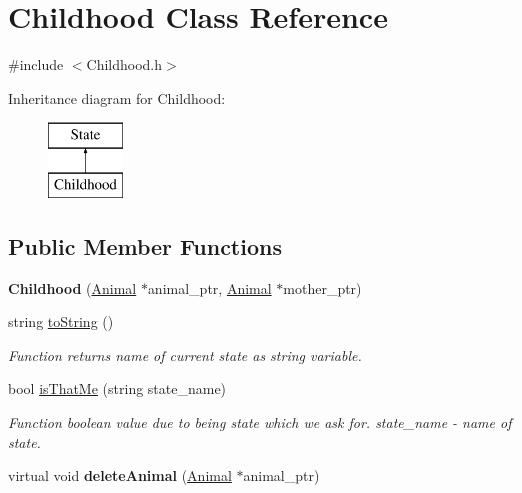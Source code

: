 \hypertarget{class_childhood}{}\section{Childhood Class Reference}
\label{class_childhood}


{\ttfamily \#include $<$Childhood.\+h$>$}

Inheritance diagram for Childhood\+:\begin{figure}[H]
\begin{center}
\leavevmode
\includegraphics[height=2.000000cm]{class_childhood}
\end{center}
\end{figure}
\subsection*{Public Member Functions}
\begin{DoxyCompactItemize}
\item 
\hypertarget{class_childhood_aaec37e08923bd9b4ee70fb91978f6872}{}{\bfseries Childhood} (\hyperlink{class_animal}{Animal} $\ast$animal\+\_\+ptr, \hyperlink{class_animal}{Animal} $\ast$mother\+\_\+ptr)\label{class_childhood_aaec37e08923bd9b4ee70fb91978f6872}

\item 
string \hyperlink{class_childhood_af7cb046d34104c1f8eabf20f2c35321e}{to\+String} ()
\begin{DoxyCompactList}\small\item\em Function returns name of current state as string variable. \end{DoxyCompactList}\item 
bool \hyperlink{class_childhood_ad94f07e6803c6bdbd6ee752e6eef9019}{is\+That\+Me} (string state\+\_\+name)
\begin{DoxyCompactList}\small\item\em Function boolean value due to being state which we ask for.  state\+\_\+name -\/ name of state. \end{DoxyCompactList}\item 
\hypertarget{class_childhood_a5a9852ffda98ed530df8b2276fb43d10}{}virtual void {\bfseries delete\+Animal} (\hyperlink{class_animal}{Animal} $\ast$animal\+\_\+ptr)\label{class_childhood_a5a9852ffda98ed530df8b2276fb43d10}

\end{DoxyCompactItemize}
